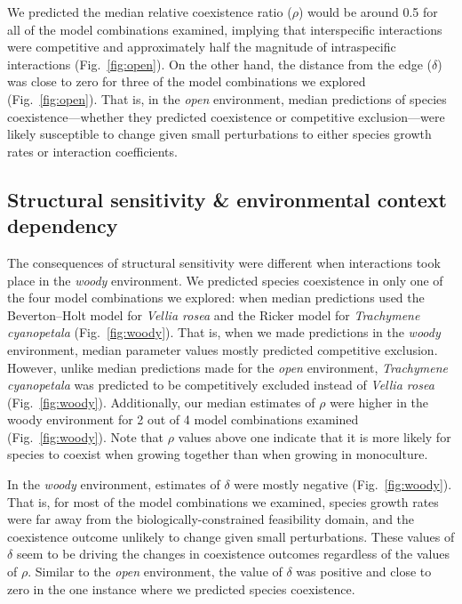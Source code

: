 \begin{refsection}
We predicted the median relative coexistence ratio ($\rho$) would be around 0.5 for all of the model combinations examined, implying that interspecific interactions were competitive and approximately half the magnitude of intraspecific interactions (Fig.~\ref{fig:open}). On the other hand, the distance from the edge ($\delta$) was close to zero for three of the model combinations we explored (Fig.~\ref{fig:open}). That is, in the \textit{open} environment, median predictions of species coexistence---whether they predicted coexistence or competitive exclusion---were likely susceptible to change given small perturbations to either species growth rates or interaction coefficients.



\subsection*{Structural sensitivity \& environmental context dependency }


The consequences of structural sensitivity were different when interactions took place in the \textit{woody} environment. We predicted species coexistence in only one of the four model combinations we explored: when median predictions used the Beverton--Holt model for \textit{Vellia rosea} and the Ricker model for \textit{Trachymene cyanopetala} (Fig.~\ref{fig:woody}). That is, when we made predictions in the \textit{woody} environment, median parameter values mostly predicted competitive exclusion. However, unlike median predictions made for the \textit{open} environment, \textit{Trachymene cyanopetala} was predicted to be competitively excluded instead of \textit{Vellia rosea} (Fig.~\ref{fig:woody}). Additionally, our median estimates of $\rho$  were higher in the woody environment for 2 out of 4 model combinations examined (Fig.~\ref{fig:woody}). Note that $\rho$ values above one indicate that it is more likely for species to  coexist when growing together than when growing in monoculture.

In the \textit{woody} environment, estimates of $\delta$ were mostly negative (Fig.~\ref{fig:woody}). That is, for most of the model combinations we examined, species growth rates were far away from the biologically-constrained feasibility domain, and the coexistence outcome unlikely to change given small perturbations. These values of $\delta$ seem to be driving the changes in coexistence outcomes regardless of the values of $\rho$. Similar to the \textit{open} environment, the value of $\delta$ was positive and close to zero in the one instance where we predicted species coexistence.


\end{refsection}
